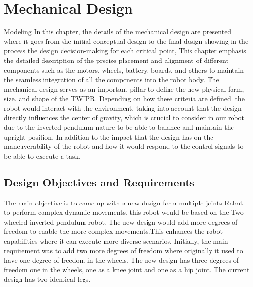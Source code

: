 \chapter{Mechanical Design}

\graphicspath{{./Figures/Mechanical Design/}}





 Modeling In this chapter, the details of the mechanical design are presented. where it goes from the initial conceptual design to the final design showing in the process the design decision-making for each critical point, This chapter emphasis the detailed description of the precise placement and alignment of different components such as the motors, wheels, battery, boards, and others to maintain the seamless integration of all the components into the robot body.
\newline
The mechanical design serves as an important pillar to define the new physical form, size, and shape of the TWIPR. Depending on how these criteria are defined, the robot would interact with the environment. taking into account that the design directly influences the center of gravity, which is crucial to consider in our robot due to the inverted pendulum nature to be able to balance and maintain the upright position. In addition to the impact that the design has on the maneuverability of the robot and how it would respond to the control signals to be able to execute a task.

\newpage


\section{Design Objectives and Requirements}

	The main objective is to come up with a new design for a multiple joints Robot to perform complex dynamic movements. this robot would be based on the Two wheeled inverted pendulum robot. The new design would add more degrees of freedom to enable the more complex movements.This enhances the robot capabilities where it can execute more diverse scenarios.
	Initially, the main requirement was to add two more degrees of freedom where originally it used to have one degree of freedom in the wheels. The new design has three degrees of freedom one in the wheels, one as a knee joint and one as a hip joint. The current design has two identical legs.

